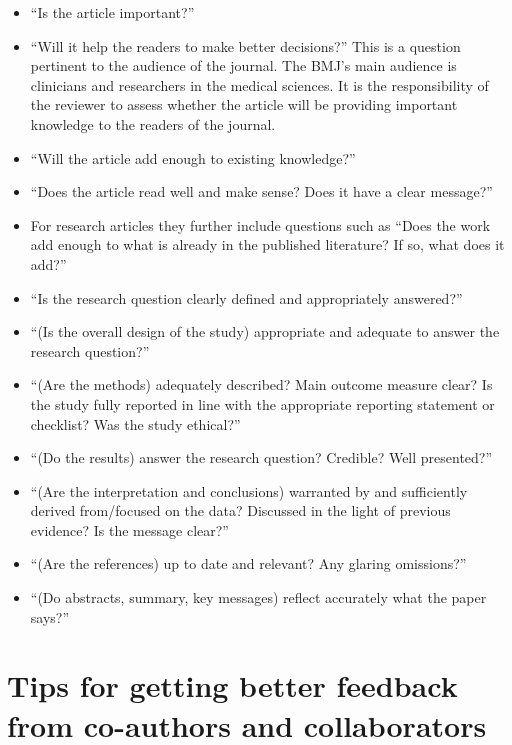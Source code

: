 \documentclass[
]{book}
\providecommand{\tightlist}{%
  \setlength{\itemsep}{0pt}\setlength{\parskip}{0pt}}
\begin{document}
\begin{itemize}
  \begin{itemize}
  \tightlist
  \item
    ``Is the article important?''
  \item
    ``Will it help the readers to make better decisions?'' This is a question pertinent to the audience of the journal. The BMJ's main audience is clinicians and researchers in the medical sciences. It is the responsibility of the reviewer to assess whether the article will be providing important knowledge to the readers of the journal.
  \item
    ``Will the article add enough to existing knowledge?''
  \item
    ``Does the article read well and make sense? Does it have a clear message?''
  \item
    For research articles they further include questions such as ``Does the work add enough to what is already in the published literature? If so, what does it add?''
  \item
    ``Is the research question clearly defined and appropriately answered?''
  \item
    ``(Is the overall design of the study) appropriate and adequate to answer the research question?''
  \item
    ``(Are the methods) adequately described? Main outcome measure clear? Is the study fully reported in line with the appropriate reporting statement or checklist? Was the study ethical?''
  \item
    ``(Do the results) answer the research question? Credible? Well presented?''
  \item
    ``(Are the interpretation and conclusions) warranted by and sufficiently derived from/focused on the data? Discussed in the light of previous evidence? Is the message clear?''
  \item
    ``(Are the references) up to date and relevant? Any glaring omissions?''
  \item
    ``(Do abstracts, summary, key messages) reflect accurately what the paper says?''
  \end{itemize}
\end{itemize}

\hypertarget{tips-for-getting-better-feedback-from-co-authors-and-collaborators}{%
\section{Tips for getting better feedback from co-authors and collaborators}\label{tips-for-getting-better-feedback-from-co-authors-and-collaborators}}
\end{document}
